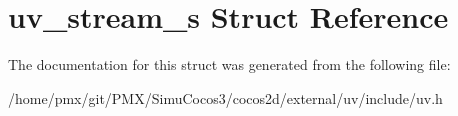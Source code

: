 \hypertarget{structuv__stream__s}{}\section{uv\+\_\+stream\+\_\+s Struct Reference}
\label{structuv__stream__s}


The documentation for this struct was generated from the following file\+:\begin{DoxyCompactItemize}
\item 
/home/pmx/git/\+P\+M\+X/\+Simu\+Cocos3/cocos2d/external/uv/include/uv.\+h\end{DoxyCompactItemize}
